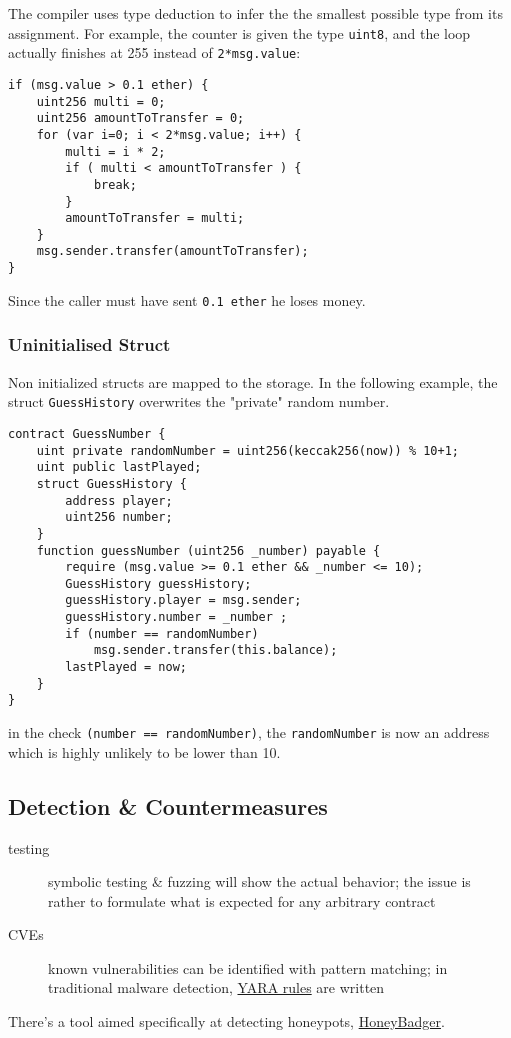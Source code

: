 The compiler uses type deduction to infer the the smallest possible type from its assignment. For example, the counter is given the type \lstinline[language=Solidity]{uint8}, and the loop actually finishes at 255 instead of \lstinline[language=Solidity]{2*msg.value}:

\begin{lstlisting}[language=Solidity]
if (msg.value > 0.1 ether) {
    uint256 multi = 0;
    uint256 amountToTransfer = 0;
    for (var i=0; i < 2*msg.value; i++) {
        multi = i * 2;
        if ( multi < amountToTransfer ) {
            break;
        }
        amountToTransfer = multi;
    }
    msg.sender.transfer(amountToTransfer);
}
\end{lstlisting}

Since the caller must have sent \lstinline[language=Solidity]{0.1 ether} he loses money.

\subsubsection{Uninitialised Struct}

Non initialized structs are mapped to the storage. In the following example, the struct \lstinline[language=Solidity]{GuessHistory} overwrites the "private" random number.

\begin{lstlisting}[language=Solidity]
contract GuessNumber {
    uint private randomNumber = uint256(keccak256(now)) % 10+1;
    uint public lastPlayed;
    struct GuessHistory {
        address player;
        uint256 number;
    }
    function guessNumber (uint256 _number) payable {
        require (msg.value >= 0.1 ether && _number <= 10);
        GuessHistory guessHistory;
        guessHistory.player = msg.sender;
        guessHistory.number = _number ;
        if (number == randomNumber)
            msg.sender.transfer(this.balance);
        lastPlayed = now;
    }
}
\end{lstlisting}

in the check \lstinline[language=Solidity]{(number == randomNumber)}, the \lstinline[language=Solidity]{randomNumber} is now an address which is highly unlikely to be lower than 10.

\subsection{Detection \& Countermeasures}

\begin{description}
\item[testing]{symbolic testing \& fuzzing will show the actual behavior; the issue is rather to formulate what is expected for any arbitrary contract}
\item[CVEs]{known vulnerabilities can be identified with pattern matching; in traditional malware detection, \href{https://yara.readthedocs.io/en/stable/writingrules.html}{YARA rules} are written}
\end{description}

There's a tool aimed specifically at detecting honeypots, \href{https://github.com/christoftorres/HoneyBadger}{HoneyBadger}.
